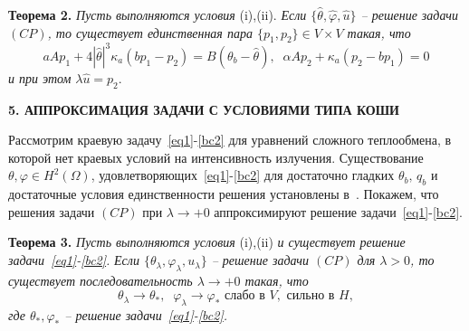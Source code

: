 \documentclass[12pt]{article}
\begin{document}
    \textbf{Теорема 2.}
    {\it Пусть выполняются условия} (i),(ii).
    {\it Если $\{\hat{\theta}, \hat{\varphi}, \hat{u}\}$ -- решение
    задачи $(CP)$, то существует единственная пара $\{p_1, p_2 \} \in V\times V$
    такая, что}
    \begin{equation}\label{AS}
         aAp_1 +4|\hat{\theta}|^3 \kappa_a(bp_1 - p_2) = B(\theta_b - \hat{\theta}), \;\;
    \alpha A p_2 + \kappa_a (p_2 - b p_1)=0
    \end{equation}
    {\it и при этом} $\lambda\hat{u} = p_2.$




    \begin{center}
        \textbf{5. АППРОКСИМАЦИЯ ЗАДАЧИ С УСЛОВИЯМИ ТИПА КОШИ}
    \end{center}


    Рассмотрим краевую задачу~\eqref{eq1}-\eqref{bc2} для уравнений сложного теплообмена, в которой нет краевых условий на
    интенсивность излучения.
    Существование $\theta,\varphi\in H^2(\Omega)$, удовлетворяющих~\eqref{eq1}-\eqref{bc2}
    для достаточно гладких
    $\theta_b,\, q_b$ и достаточные условия единственности решения
    установлены в~\cite{CMMP20}.
    Покажем, что решения задачи $(CP)$ при $\lambda\to+0$
    аппроксимируют решение задачи~\eqref{eq1}-\eqref{bc2}.


    \textbf{Теорема 3.}
    {\it
    Пусть выполняются условия} (i),(ii) {\it и существует решение задачи~\eqref{eq1}-\eqref{bc2}.}
    {\it  Если $\{\theta_\lambda,\varphi_\lambda,u_\lambda\}$ -- решение
    задачи $(CP)$ для $\lambda>0$, то существует последовательность
    $\lambda\to +0$
    такая, что}
    \[
        \theta_\lambda\rightarrow\theta_*, \;\; \varphi_\lambda\rightarrow\varphi_*
        \text{ слабо в }V,\text{ сильно в }H,
    \]
    {\it где $\theta_*,\varphi_*$ -- решение задачи~\eqref{eq1}-\eqref{bc2}.}
\end{document}
